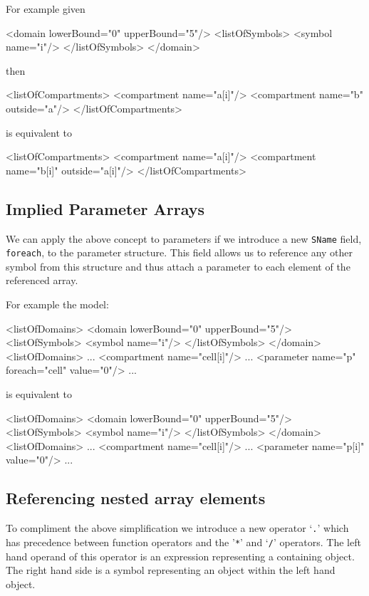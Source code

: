 \documentclass{cekarticle}
\begin{document}
For example given

\begin{example}
<domain lowerBound="0" upperBound="5"/>
    <listOfSymbols>
        <symbol name="i"/>
    </listOfSymbols>
</domain>
\end{example}

then

\begin{example}
<listOfCompartments>
    <compartment name="a[i]"/>
    <compartment name="b" outside="a"/>
</listOfCompartments>
\end{example}

is equivalent to

\begin{example}
<listOfCompartments>
    <compartment name="a[i]"/>
    <compartment name="b[i]" outside="a[i]"/>
</listOfCompartments>
\end{example}

\subsection{Implied Parameter Arrays}

We can apply the above concept to parameters if we introduce a
new \texttt{SName} field, \texttt{foreach}, to the parameter
structure. This field allows us to reference any other symbol
from this structure and thus attach a parameter to each element
of the referenced array.

For example the model:
\begin{example}
<listOfDomains>
    <domain lowerBound="0" upperBound="5"/>
        <listOfSymbols>
            <symbol name="i"/>
        </listOfSymbols>
    </domain>
<listOfDomains>
...
<compartment name="cell[i]"/>
...
<parameter name="p" foreach="cell" value="0"/>
...
\end{example}
is equivalent to
\begin{example}
<listOfDomains>
    <domain lowerBound="0" upperBound="5"/>
        <listOfSymbols>
            <symbol name="i"/>
        </listOfSymbols>
    </domain>
<listOfDomains>
...
<compartment name="cell[i]"/>
...
<parameter name="p[i]" value="0"/>
...
\end{example}

\subsection{Referencing nested array elements}

To compliment the above simplification we introduce a new
operator `\texttt{.}' which has precedence between function
operators and the '\texttt{*}' and `\texttt{/}' operators. The
left hand operand of this operator is an expression representing
a containing object. The right hand side is a symbol representing
an object within the left hand object.
\end{document}

